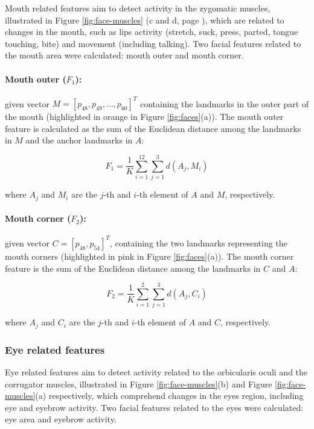Mouth related features aim to detect activity in the zygomatic muscles, illustrated in Figure \ref{fig:face-muscles} (c and d, page \pageref{fig:face-muscles}), which are related to changes in the mouth, such as lips activity (stretch, suck, press, parted, tongue touching, bite) and movement (including talking). Two facial features related to the mouth area were calculated: mouth outer and mouth corner.

\paragraph{Mouth outer ($F_1$):} given vector $M = [p_{48}, p_{49}, \dots, p_{60}]^T$ containing the landmarks in the outer part of the mouth (highlighted in orange in Figure \ref{fig:faces}(a)). The mouth outer feature is calculated as the sum of the Euclidean distance among the landmarks in $M$ and the anchor landmarks in $A$:

\[
F_1 = \frac{1}{K} \sum_{i=1}^{12} \sum_{j=1}^{3} d(A_j, M_i)
\]

where $A_j$ and $M_i$ are the $j$-th and $i$-th element of $A$ and $M$, respectively.

\paragraph{Mouth corner ($F_2$):} given vector $C = [p_{48}, p_{54}]^T$, containing the two landmarks representing the mouth corners (highlighted in pink in Figure \ref{fig:faces}(a)). The mouth corner feature is the sum of the Euclidean distance among the landmarks in $C$ and $A$:

\[
F_2 = \frac{1}{K} \sum_{i=1}^{2} \sum_{j=1}^{3} d(A_j, C_i)
\]

where $A_j$ and $C_i$ are the $j$-th and $i$-th element of $A$ and $C$, respectively.

\subsubsection{Eye related features}

Eye related features aim to detect activity related to the orbicularis oculi and the corrugator muscles, illustrated in Figure \ref{fig:face-muscles}(b) and Figure \ref{fig:face-muscles}(a) respectively, which comprehend changes in the eyes region, including eye and eyebrow activity. Two facial features related to the eyes were calculated: eye area and eyebrow activity.

